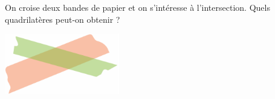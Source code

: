 
On croise deux bandes de papier et on s'intéresse à l'intersection.  Quels quadrilatères peut-on obtenir ?
\begin{center}
\includegraphics[width=5cm]{deux_bandes.pdf}
\end{center}
